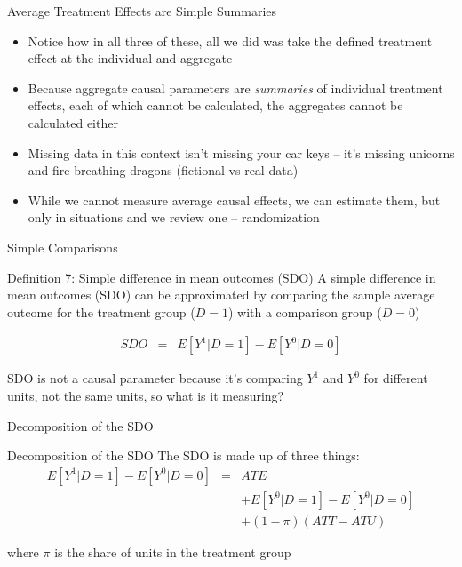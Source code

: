 \documentclass{beamer}
\begin{document}
\begin{frame}{Average Treatment Effects are Simple Summaries}

  \begin{itemize}
	\item Notice how in all three of these, all we did was take the defined treatment effect at the individual and aggregate
	\item Because aggregate causal parameters are \emph{summaries} of individual treatment effects, each of which cannot be calculated, the aggregates cannot be calculated either
	\item Missing data in this context isn't missing your car keys -- it's missing unicorns and fire breathing dragons (fictional vs real data)
	\item While we cannot measure average causal effects, we can estimate them, but only in situations and we review one -- randomization
  \end{itemize}

\end{frame}







\begin{frame}{Simple Comparisons}


  \begin{block}{Definition 7: Simple difference in mean outcomes (SDO)}
    A simple difference in mean outcomes (SDO) can be approximated by comparing the sample average outcome for the treatment group ($D=1$) with a comparison group ($D=0$)
    
    \begin{eqnarray*}
      SDO &=& E[Y^1 | D=1] - E[Y^0 | D=0]
    \end{eqnarray*}
  \end{block}
  \bigskip

SDO is not a causal parameter because it's comparing $Y^1$ and $Y^0$ for different units, not the same units, so what is it measuring? 

\end{frame}


\begin{frame}{Decomposition of the SDO}

  \begin{block}{Decomposition of the SDO}
    The SDO is made up of three things:
    \begin{eqnarray*}
      E[Y^1 | D=1] - E[Y^0 | D=0]&=& ATE\nonumber \\
      &&+ E[Y^0|D=1] - E[Y^0|D=0] \nonumber \\
      && + (1-\pi)(ATT - ATU)
    \end{eqnarray*}
  \end{block}

\bigskip

where $\pi$ is the share of units in the treatment group
\end{frame}
\end{document}
